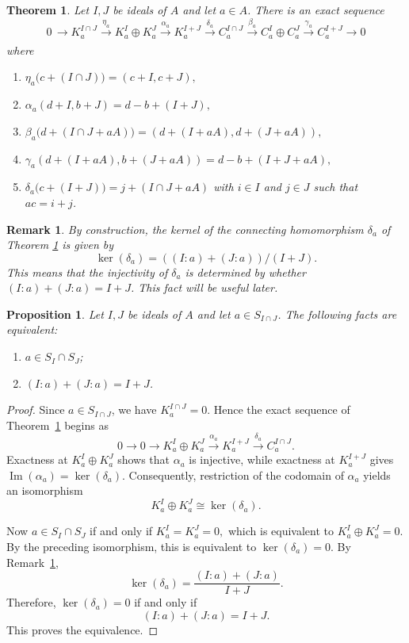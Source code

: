 \documentclass[10pt,a4paper]{amsart}
\newtheorem{theorem}{Theorem}
\newtheorem{remark}{Remark}
\newtheorem{proposition}{Proposition}
\newcommand{\aar}[2][]{\xrightarrow[#1]{#2}}
\begin{document}
\begin{theorem}\label{thmMayerVietsequence}
    Let $I,J$ be ideals of $A$ and let $a\in A$. There is an exact sequence 
    $$0\,\aar{} K^{I \cap J}_a \aar{\eta_a} {K_a^I \oplus K_a^J} \aar{\alpha_a} K_a^{I+J}  \aar{\delta_a} C_a^{I \cap J} \aar{\beta_a} {C_a^I \oplus C_a^J} \aar{\gamma_a} C_a^{I+J} \aar{} 0 $$
    where 
\begin{enumerate}
\item[$\bullet$] $\eta_a\bigl(c+(I\cap J)\bigr)
    = (c+I,c+J),$
\item[$\bullet$] $\alpha_a(d+I,b+J)
  =d-b+(I+J),$
\item[$\bullet$]    $\beta_a\bigl(d+(I\cap J+aA)\bigr)
   =(d+(I+aA),d+(J+aA)),$
\item[$\bullet$] $\gamma_a(d+(I+aA),b+(J+aA))
    =d-b+(I+J+aA),$

    \item[$\bullet$] $\delta_a\bigl(c+(I+J)\bigr)=j+(I\cap J+aA)
    $ with $i\in I$ and $j\in J$ such that $ac=i+j$.
\end{enumerate}
\end{theorem}

\begin{remark}\label{remkerdelta}
    By construction, the kernel of the connecting homomorphism $\delta_{a}$ of Theorem \ref{thmMayerVietsequence} is given by 
    $$\ker(\delta_a)=((I:a)+(J:a))/(I+J).$$
    This means that the injectivity of $\delta_a$ is determined by whether $(I:a)+(J:a)=I+J$. This fact will be useful later.
\end{remark}

 \begin{proposition}\label{propeqfacts}
     Let $I,J$ be ideals of $A$ and let $a\in S_{I\cap J}$. The following facts are equivalent:
     \begin{enumerate}
         \item $a\in S_I \cap S_J$;
         \item $(I:a)+(J:a)=I+J$.
     \end{enumerate}
 \end{proposition}

\begin{proof}
	Since $a\in S_{I\cap J}$, we have
	$
	K_a^{I\cap J}=0.
	$
	Hence the exact sequence of Theorem~\ref{thmMayerVietsequence} begins as
	\[
	0\longrightarrow 0
	\longrightarrow K_a^I\oplus K_a^J
	\xrightarrow{\alpha_a} K_a^{I+J}
	\xrightarrow{\delta_a} C_a^{I\cap J}.
	\]
	Exactness at $K_a^I\oplus K_a^J$ shows that $\alpha_a$ is injective, while
	exactness at $K_a^{I+J}$ gives
	$
	\operatorname{Im}(\alpha_a)=\ker(\delta_a).
	$
	Consequently, restriction of the codomain of $\alpha_a$ yields an
	isomorphism
	\[
	K_a^I\oplus K_a^J \cong \ker(\delta_a).
	\]
	
	Now
	$
	a\in S_I\cap S_J
	$
	if and only if
	$
	K_a^I=K_a^J=0,
	$
	which is equivalent to
	$
	K_a^I\oplus K_a^J=0.
	$
	By the preceding isomorphism, this is equivalent to
	$
	\ker(\delta_a)=0.
	$
	By Remark~\ref{remkerdelta},
	\[
	\ker(\delta_a)
	=
	\frac{(I:a)+(J:a)}{I+J}.
	\]
	Therefore,
	$
	\ker(\delta_a)=0
	$
	if and only if
	\[
	(I:a)+(J:a)=I+J.
	\]
	This proves the equivalence.
\end{proof}
\end{document}
